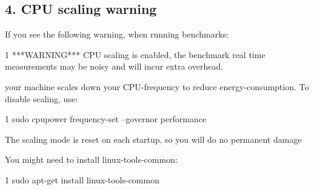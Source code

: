 \subsection*{4. C\+PU scaling warning}

If you see the following warning, when running benchmarks\+:


\begin{DoxyCode}
1 ***WARNING*** CPU scaling is enabled, the benchmark real time measurements may be noisy and will incur
       extra overhead.
\end{DoxyCode}


your machine scales down your C\+P\+U-\/frequency to reduce energy-\/consumption. To disable scaling, use\+:


\begin{DoxyCode}
1 sudo cpupower frequency-set --governor performance
\end{DoxyCode}


The scaling mode is reset on each startup, so you will do no permanent damage

You might need to install linux-\/tools-\/common\+:


\begin{DoxyCode}
1 sudo apt-get install linux-tools-common
\end{DoxyCode}
 

 